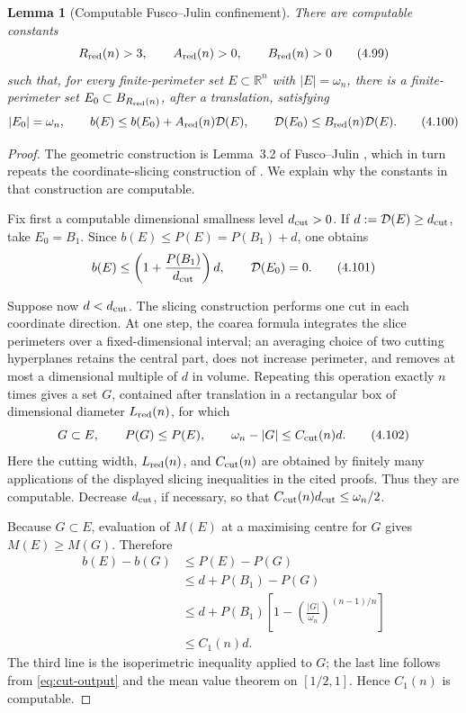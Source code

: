 \documentclass[11pt]{amsart}
\newtheorem{lemma}[theorem]{Lemma}
\theoremstyle{definition}
\newcommand{\R}{\mathbb R}
\newcommand{\Per}{P}
\newcommand{\Def}{\mathcal D}
\begin{document}
\begin{lemma}[Computable Fusco--Julin confinement]\label{lem:computable-confinement}
There are computable constants
\[
   R_{\rm red}(n)>3,\qquad
   A_{\rm red}(n)>0,\qquad B_{\rm red}(n)>0
\tag{4.99}\label{eq:reduction-data}
\]
such that, for every finite-perimeter set \(E\subset\R^n\) with
\(|E|=\omega_n\), there is a finite-perimeter set
\(E_0\subset B_{R_{\rm red}(n)}\), after a translation, satisfying
\[
   |E_0|=\omega_n,\qquad
   b(E)\le b(E_0)+A_{\rm red}(n)\Def(E),\qquad
   \Def(E_0)\le B_{\rm red}(n)\Def(E).
\tag{4.100}\label{eq:computable-confinement}
\]
\end{lemma}

\begin{proof}
The geometric construction is Lemma~3.2 of Fusco--Julin
\cite[Lemma~3.2]{FJ}, which in turn repeats the coordinate-slicing
construction of \cite[Lemma~5.1]{FigalliMaggiPratelli}.  We explain why
the constants in that construction are computable.

Fix first a computable dimensional smallness level \(d_{\rm cut}>0\).
If \(d:=\Def(E)\ge d_{\rm cut}\), take \(E_0=B_1\).  Since
\(b(E)\le\Per(E)=\Per(B_1)+d\), one obtains
\[
   b(E)\le
      \left(1+\frac{\Per(B_1)}{d_{\rm cut}}\right)d,
   \qquad \Def(E_0)=0.
\tag{4.101}\label{eq:cut-large}
\]

Suppose now \(d<d_{\rm cut}\).  The slicing construction performs one
cut in each coordinate direction.  At one step, the coarea formula
integrates the slice perimeters over a fixed-dimensional interval; an
averaging choice of two cutting hyperplanes retains the central part,
does not increase perimeter, and removes at most a dimensional multiple
of \(d\) in volume.  Repeating this operation exactly \(n\) times gives
a set \(G\), contained after translation in a rectangular box of
dimensional diameter \(L_{\rm red}(n)\), for which
\[
   G\subset E,\qquad
   \Per(G)\le\Per(E),\qquad
   \omega_n-|G|\le C_{\rm cut}(n)d.
\tag{4.102}\label{eq:cut-output}
\]
Here the cutting width, \(L_{\rm red}(n)\), and \(C_{\rm cut}(n)\) are
obtained by finitely many applications of the displayed slicing
inequalities in the cited proofs.  Thus they are computable.  Decrease
\(d_{\rm cut}\), if necessary, so that
\(C_{\rm cut}(n)d_{\rm cut}\le\omega_n/2\).

Because \(G\subset E\), evaluation of \(M(E)\) at a maximising centre
for \(G\) gives \(M(E)\ge M(G)\).  Therefore
\[
\begin{aligned}
   b(E)-b(G)
   &\le\Per(E)-\Per(G)\\
   &\le d+\Per(B_1)-\Per(G)\\
   &\le d+\Per(B_1)
       \left[1-\left(\frac{|G|}{\omega_n}\right)^{(n-1)/n}\right]\\
   &\le C_1(n)d.
\end{aligned}
\tag{4.103}\label{eq:beta-cut-control}
\]
The third line is the isoperimetric inequality applied to \(G\); the
last line follows from \eqref{eq:cut-output} and the mean value theorem
on \([1/2,1]\).  Hence \(C_1(n)\) is computable.


\end{proof}
\end{document}
